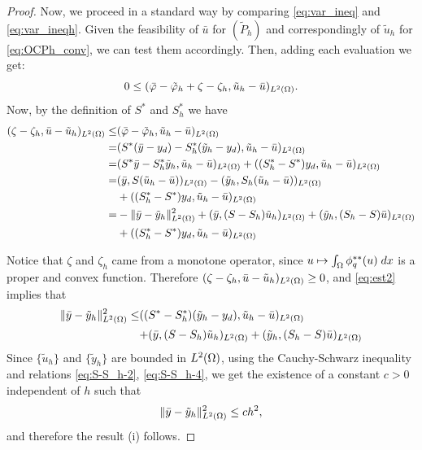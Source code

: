 \begin{proof}
Now, we proceed in a standard way by comparing \eqref{eq:var_ineq} and \eqref{eq:var_ineqh}. Given the feasibility of $\bar u$ for $(\tilde P_h)$ and correspondingly of $\tilde u_h$ for \eqref{eq:OCPh_conv}, we can test them accordingly. Then, adding each evaluation we get:
 $$ 0 \leq  (\bar\varphi -\tilde\varphi_h + \zeta - \zeta_h , \tilde u_h - \bar u)_{L^2(\Omega)}.$$
Now, by the definition of $S^*$ and $S_h^*$ we have
 \begin{align}
 	 (\zeta - \zeta_h , \bar u -\tilde u_h)_{L^2(\Omega)}  \leq & (\bar\varphi -\tilde\varphi_h ,\tilde u_h  - \bar u)_{L^2(\Omega)} \nonumber \\
 	 = &  (S^*(\bar y - y_d) -S_h^*(\tilde y_h -y_d ),\tilde u_h  - \bar u)_{L^2(\Omega)}\nonumber \\
 	 = &  (S^*\bar y  -S_h^* \tilde y_h ,\tilde u_h  - \bar u)_{L^2(\Omega)}+ ( (S_h^*-S^*) y_d,\tilde u_h  - \bar u)_{L^2(\Omega)} \nonumber \\
 	= &  (\bar y  ,S(\tilde u_h  - \bar u))_{L^2(\Omega)}-(\tilde y_h  ,S_h(\tilde u_h  - \bar u))_{L^2(\Omega)} \nonumber\\ 
  &+( (S_h^*-S^*) y_d,\tilde u_h  - \bar u)_{L^2(\Omega)}  \nonumber \\
 	= & - \|\bar y- \tilde y_h\|_{L^2(\Omega)}^2+ (\bar y, (S-S_h)\tilde u_h  )_{L^2(\Omega)} + (\tilde y_h, (S_h-S)\bar u  )_{L^2(\Omega)}\nonumber \\
 	  &+( (S_h^*-S^*) y_d,\tilde u_h  - \bar u)_{L^2(\Omega)} \label{eq:est2}
 \end{align}
 
Notice that $\zeta$ and $\zeta_h$ came from a monotone operator, since $u\mapsto\int_{\Omega}\phi_q^{**}(u)\; dx$ is a proper and convex function. Therefore $(\zeta - \zeta_h , \bar u -\tilde u_h)_{L^2(\Omega)}\ge 0$, and \eqref{eq:est2} implies that
\begin{equation}\label{eq:est2.1}
\begin{split}
\|\bar y- \tilde y_h\|_{L^2(\Omega)}^2 \leq  &((S^*-S_h^*)(\tilde y_h-y_d), \tilde u_h  - \bar u)_{L^2(\Omega)}\\
&{+ (\bar y, (S-S_h)\tilde u_h  )_{L^2(\Omega)} + (\tilde y_h, (S_h-S)\bar u  )_{L^2(\Omega)}} 
 \end{split}
 \end{equation}
Since $\{\tilde u_h\}$ and $\{\tilde y_h\}$ are bounded in $L^2(\Omega)$, using the Cauchy-Schwarz inequality and relations \eqref{eq:S-S_h-2}, \eqref{eq:S-S_h-4}, we get the existence of a constant $c>0$ independent of $h$ such that
\begin{equation}\label{eq:est3}
    \|\bar y- \tilde y_h\|_{L^2(\Omega)}^2 \le c h^2,
\end{equation}
and therefore the result (i) follows.


\end{proof}
